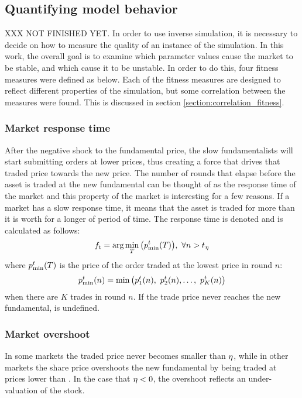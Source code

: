 \subsection{Quantifying model behavior}\label{section:simulation_fitness}
XXX NOT FINISHED YET. 
In order to use inverse simulation, it is necessary to decide on how to measure the quality of an instance of the simulation. In this work, the overall goal is to examine which parameter values cause the market to be stable, and which cause it to be unstable. In order to do this, four fitness measures were defined as below. Each of the fitness measures are designed to reflect different properties of the simulation, but some correlation between the measures were found. This is discussed in section \ref{section:correlation_fitness}.
\subsubsection{Market response time}
After the negative shock to the fundamental price, the slow fundamentalists will start submitting orders at lower prices, thus creating a force that drives that traded price towards the new price. The number of rounds that elapse before the asset is traded at the new fundamental  can be thought of as the response time of the market and this property of the market is interesting for a few reasons. If a market has a slow response time, it means that the asset is traded for more than it is worth for a longer of period of time. The response time is denoted \timetoreachnewfundamental{} and is calculated as follows:
\begin{equation}\label{eq:timetoreachnewfundamental}
f_\text{t} = \arg\min_T \big( p^t_{\min}(T)\big),\ \forall n > t_{}{_\eta}
\end{equation}
where $p^t_{\min}(T)$ is the price of the order traded at the lowest price in round $n$:
\begin{equation}
\tradeprice{n}{\min} = \min \big(\tradeprice{n}{1},\ \tradeprice{n}{2}, \hdots,\ \tradeprice{n}{K}\big)
\end{equation}
when there are $K$ trades in round $n$. If the trade price never reaches the new fundamental, \timetoreachnewfundamental{} is undefined.

\subsubsection{Market overshoot}
In some markets the traded price never becomes smaller than $\eta$, while in other markets the share price overshoots the new fundamental by being traded at prices lower than \fundamentalaftershock. In the case that $\eta < 0$, the overshoot reflects an under-valuation of the stock.

